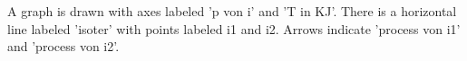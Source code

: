 A graph is drawn with axes labeled 'p von i' and 'T in KJ'. There is a horizontal line labeled 'isoter' with points labeled i1 and i2. Arrows indicate 'process von i1' and 'process von i2'.